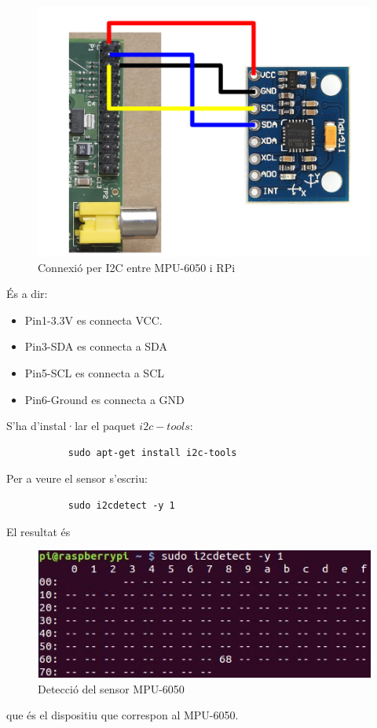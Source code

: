 \documentclass[twoside]{article}
\begin{document}
\begin{figure}[h!]
\begin{center}
\includegraphics[scale=0.2,viewport=0 200 800 720,clip]{images/ConSens.jpg}
\caption{Connexió per I2C entre MPU-6050 i RPi}
\end{center}
\end{figure}


És a dir:
\begin{itemize}
\item Pin1-3.3V es connecta VCC.
\item Pin3-SDA es connecta a SDA
\item Pin5-SCL es connecta a SCL
\item Pin6-Ground es connecta a GND
\end{itemize} 
S'ha d'instal·lar el paquet $i2c-tools$:
\begin{verbatim}
           sudo apt-get install i2c-tools
\end{verbatim}
Per a veure el sensor s'escriu:
\begin{verbatim}
           sudo i2cdetect -y 1
\end{verbatim}
El resultat és 

\begin{figure}[h!]
\begin{center}
\includegraphics[scale=0.7]{images/i2cdetect.jpg}
\caption{Detecció del sensor MPU-6050}
\end{center}
\end{figure}
que és el dispositiu que correspon al MPU-6050.
\end{document}
